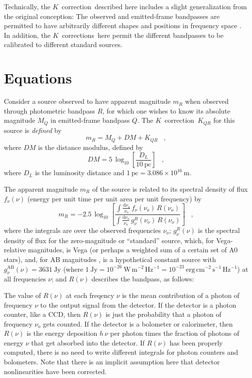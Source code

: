 \documentclass[preprint]{aastex}
\newcommand{\kcorrection}{$K$~correction}
\newcommand{\kcorrections}{{\kcorrection}s}
\newcommand{\nuobs}{\nu_o}
\begin{document}
Technically, the \kcorrection\ described here includes a slight
generalization from the original conception: The observed and
emitted-frame bandpasses are permitted to have arbitrarily different
shapes and positions in frequency space \citep[cf.,][]{kim96a}.  In
addition, the \kcorrections\ here permit the different bandpasses to
be calibrated to different standard sources.

\section{Equations}

Consider a source observed to have apparent magnitude $m_R$ when
observed through photometric bandpass $R$, for which one wishes to
know its absolute magnitude $M_Q$ in emitted-frame bandpass $Q$.  The
\kcorrection\ $K_{QR}$ for this source is \emph{defined} by
\begin{equation}
\label{eq:definition}
m_R = M_Q + DM + K_{QR} \;\;\;,
\end{equation}
where $DM$ is the distance modulus, defined by
\begin{equation}
DM = 5\,\log_{10}\left[\frac{D_L}{10~\mathrm{pc}}\right] \;\;\;,
\end{equation}
where $D_L$ is the luminosity distance \citep[eg,][]{hogg99cosm} and
$1~\mathrm{pc}= 3.086\times 10^{16}~\mathrm{m}$.

The apparent magnitude $m_R$ of the source is related to its spectral
density of flux $f_{\nu}(\nu)$ (energy per unit time per unit area per
unit frequency) by
\begin{equation}
m_R = -2.5\,\log_{10}\left[
  \frac{\displaystyle
          \int\frac{\mathrm{d}\nuobs}{\nuobs}\,f_{\nu}(\nuobs)\,R(\nuobs)}
       {\displaystyle
          \int\frac{\mathrm{d}\nuobs}{\nuobs}\,g^R_{\nu}(\nuobs)\,R(\nuobs)}
\right] \;\;\;,
\end{equation}
where the integrals are over the observed frequencies $\nuobs$;
$g^{R}_{\nu}(\nu)$ is the spectral density of flux for the
zero-magnitude or ``standard'' source, which, for Vega-relative
magnitudes, is Vega (or perhaps a weighted sum of a certain set of A0
stars), and, for AB magnitudes \citep{oke83a}, is a hypothetical
constant source with $g^\mathrm{AB}_{\nu}(\nu)=3631~\mathrm{Jy}$
(where $1~\mathrm{Jy}= 10^{-26}~\mathrm{W\,m^{-2}\,Hz^{-1}}=
10^{-23}~\mathrm{erg\,cm^{-2}\,s^{-1}\,Hz^{-1}}$) at all frequencies
$\nu$; and $R(\nu)$ describes the bandpass, as follows:

The value of $R(\nu)$ at each freqency $\nu$ is the mean contribution
of a photon of frequency $\nu$ to the output signal from the detector.
If the detector is a photon counter, like a CCD, then $R(\nu)$ is just
the probability that a photon of frequency $\nuobs$ gets counted.  If
the detector is a bolometer or calorimeter, then $R(\nu)$ is the
energy deposition $h\,\nu$ per photon times the fraction of photons of
energy $\nu$ that get absorbed into the detector.  If $R(\nu)$ has
been properly computed, there is no need to write different integrals
for photon counters and bolometers.  Note that there is an implicit
assumption here that detector nonlinearities have been corrected.
\end{document}
